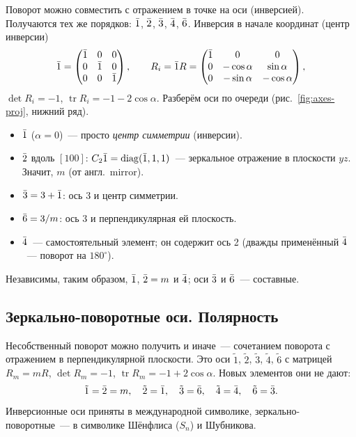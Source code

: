 Поворот можно совместить с отражением в точке на оси (инверсией).
Получаются  тех же порядков: $\bar{1}$, $\bar{2}$, $\bar{3}$, $\bar{4}$,
$\bar{6}$. Инверсия в начале координат (центр инверсии)
\begin{equation}\label{eq:inversion}
\bar1=\begin{pmatrix}\bar{1}&0&0\\0&\bar{1}&0\\0&0&\bar{1}\end{pmatrix},\qquad
R_i=\bar1R=\begin{pmatrix}\bar{1}&0&0\\0&-\cos\alpha&\sin\alpha\\0&-\sin\alpha&-\cos\alpha\end{pmatrix},
\end{equation}
$\det R_i=-1$, $\operatorname{tr}R_i=-1-2\cos\alpha$. Разберём оси по очереди
(рис.~\ref{fig:axes-proj}, нижний ряд).
\begin{itemize}
\item $\bar{1}$ ($\alpha=0$)~— просто \emph{центр симметрии} (инверсии).
\item $\bar{2}$ вдоль $[100]$: $C_2\bar1=\operatorname{diag}(\bar{1},1,1)$~— зеркальное
отражение в плоскости $yz$. Значит,  $m$ (от англ.\ mirror).
\item $\bar{3}=3+\bar{1}$: ось 3 и центр симметрии.
\item $\bar{6}=3/m$: ось 3 и перпендикулярная ей плоскость.
\item $\bar{4}$~— самостоятельный элемент; он содержит ось 2 (дважды
применённый $\bar{4}$~— поворот на $180^\circ$).
\end{itemize}
Независимы, таким образом, $\bar{1}$, $\bar{2}=m$ и $\bar{4}$; оси $\bar{3}$ и $\bar{6}$~— составные.

\subsection{Зеркально-поворотные оси. Полярность}\label{ssec:mirror-axes}

Несобственный поворот можно получить и иначе~— сочетанием поворота с
отражением в перпендикулярной плоскости. Это 
оси $\tilde1$, $\tilde2$, $\tilde3$, $\tilde4$, $\tilde6$ с матрицей
$R_m=mR$, $\det R_m=-1$, $\operatorname{tr}R_m=-1+2\cos\alpha$. Новых элементов они не
дают:
\[
\tilde1=\bar{2}=m,\quad\tilde2=\bar{1},\quad\tilde3=\bar{6},\quad\tilde4=\bar{4},\quad\tilde6=\bar{3} .
\]
Инверсионные оси приняты в международной символике, зеркально-поворотные~—
в символике Шёнфлиса ($S_n$) и Шубникова.

